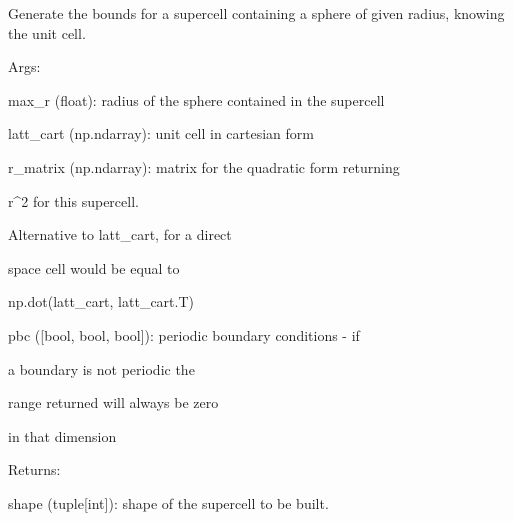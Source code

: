 \documentclass[letterpaper,10pt,english]{sphinxmanual}
\begin{document}

\begin{fulllineitems}
\label{doctree/soprano.utils:soprano.utils.minimum_supcell}
Generate the bounds for a supercell containing a sphere
of given radius, knowing the unit cell.

\begin{DUlineblock}{0em}
\item[] Args:
\item[]
\begin{DUlineblock}{\DUlineblockindent}
\item[] max\_r (float): radius of the sphere contained in the supercell
\item[] latt\_cart (np.ndarray): unit cell in cartesian form
\item[] r\_matrix (np.ndarray): matrix for the quadratic form returning
\item[]
\begin{DUlineblock}{\DUlineblockindent}
\item[] r\textasciicircum{}2 for this supercell.
\item[] Alternative to latt\_cart, for a direct
\item[] space cell would be equal to
\item[] np.dot(latt\_cart, latt\_cart.T)
\end{DUlineblock}
\item[] pbc ({[}bool, bool, bool{]}): periodic boundary conditions - if
\item[]
\begin{DUlineblock}{\DUlineblockindent}
\item[] a boundary is not periodic the
\item[] range returned will always be zero
\item[] in that dimension
\end{DUlineblock}
\end{DUlineblock}
\end{DUlineblock}

\begin{DUlineblock}{0em}
\item[] Returns:
\item[]
\begin{DUlineblock}{\DUlineblockindent}
\item[] shape (tuple{[}int{]}):  shape of the supercell to be built.
\end{DUlineblock}
\end{DUlineblock}


\end{fulllineitems}
\end{document}
